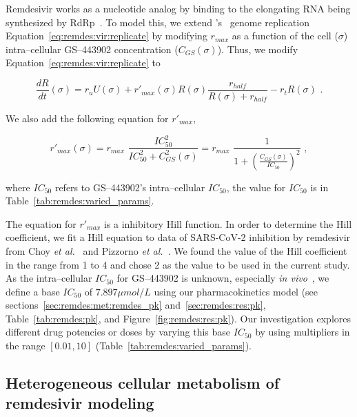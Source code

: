 Remdesivir works as a nucleotide analog by binding to the elongating RNA being synthesized by RdRp~\cite{kokic2021mechanism}. To model this, we extend \sags's~\cite{sego_modular_2020} genome replication Equation~\ref{eq:remdes:vir:replicate} by modifying $r_{max}$ as a function of the cell ($\sigma$) intra--cellular GS--443902 concentration ($C_{GS}(\sigma)$). Thus, we modify Equation~\ref{eq:remdes:vir:replicate} to

\begin{equation}\label{eq:remdes:vir:replicate_mod}
    \frac{dR}{dt}(\sigma) = r_u U(\sigma) + r'_{max}(\sigma)R(\sigma)\frac{r_{half}}{R(\sigma)+r_{half}} - r_tR(\sigma)\,\,.
\end{equation}

\noindent We also add the following equation for $r'_{max}$,

\begin{equation}\label{eq:remdes:vir:rmax_modulation}
    r'_{max}(\sigma) = r_{max}\,\,\frac{IC_{50}^2}{IC_{50}^2+C_{GS}^2(\sigma)} = r_{max}\,\,\frac{1}{1+\left(\frac{C_{GS}(\sigma)}{IC_{50}}\right)^2}\,\,,
\end{equation}

\noindent
where $IC_{50}$ refers to GS--443902's intra--cellular $IC_{50}$, the value for $IC_{50}$ is in Table~\ref{tab:remdes:varied_params}. 

The equation for $r'_{max}$ is a inhibitory Hill function. In order to determine the Hill coefficient, we fit a Hill equation to data of SARS-CoV-2 inhibition by remdesivir from Choy \emph{et al.}~\cite{choy_remdesivir_2020} and Pizzorno \emph{et al.}~\cite{pizzorno_vitro_2020}. We found the value of the Hill coefficient in the range from 1 to 4 and chose 2 as the value to be used in the current study. As the intra--cellular $IC_{50}$ for GS--443902 is unknown, especially \emph{in vivo}~\cite{hanafin_mechanismbased_2021, sun2020remdesivir}, we define a base $IC_{50}$ of $7.897\mu mol/L$ using our pharmacokinetics model (see sections~\ref{sec:remdes:met:remdes_pk} and~\ref{sec:remdes:res:pk}, Table~\ref{tab:remdes:pk}, and Figure~\ref{fig:remdes:res:pk}). Our investigation explores different drug potencies or doses by varying this base $IC_{50}$ by using multipliers in the range $[0.01, 10]$ (Table~\ref{tab:remdes:varied_params}).

\subsection{Heterogeneous cellular metabolism of remdesivir modeling}\label{sec:remdes:met:intercell_met_var}

